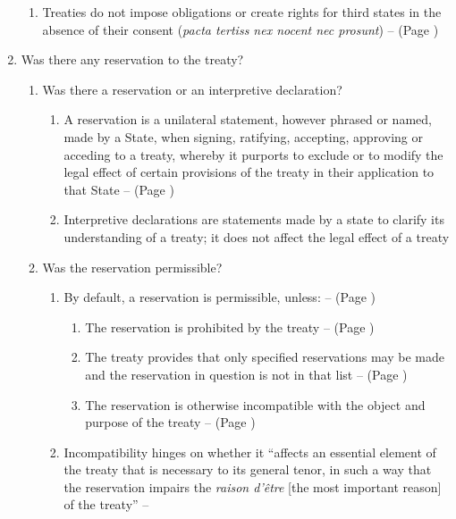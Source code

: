 \begin{enumerate}
\begin{enumerate}
        \item Treaties do not impose obligations or create rights for third states in the absence of their consent (\textit{pacta tertiss nex nocent nec prosunt}) --  (Page \pageref{VCLT Art 34})
    \end{enumerate}
    \item Was there any reservation to the treaty?
    \begin{enumerate}
        \item Was there a reservation or an interpretive declaration?
        \begin{enumerate}
            \item A reservation is a unilateral statement, however phrased or named, made by a State, when signing, ratifying, accepting, approving or acceding to a treaty, whereby it purports to exclude or to modify the legal effect of certain provisions of the treaty in their application to that State --  (Page \pageref{VCLT Art 2})
            \item Interpretive declarations are statements made by a state to clarify its understanding of a treaty; it does not affect the legal effect of a treaty
        \end{enumerate}
        \item Was the reservation permissible?
        \begin{enumerate}
            \item By default, a reservation is permissible, unless: --  (Page \pageref{VCLT Art 19})
            \begin{enumerate}
                \item The reservation is prohibited by the treaty --  (Page \pageref{VCLT Art 19})
                \item The treaty provides that only specified reservations may be made and the reservation in question is not in that list --  (Page \pageref{VCLT Art 19})
                \item The reservation is otherwise incompatible with the object and purpose of the treaty --  (Page \pageref{VCLT Art 19})
            \end{enumerate}
            \item Incompatibility hinges on whether it “affects an essential element of the treaty that is necessary to its general tenor, in such a way that the reservation impairs the \textit{raison d'être} [the most important reason] of the treaty” -- 

\end{enumerate}
\end{enumerate}
\end{enumerate}
